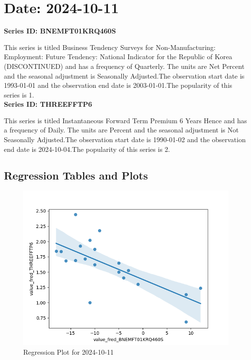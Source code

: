\section{Date: 2024-10-11}
\noindent \textbf{Series ID: BNEMFT01KRQ460S} 

\noindent This series is titled Business Tendency Surveys for Non-Manufacturing: Employment: Future Tendency: National Indicator for the Republic of Korea (DISCONTINUED) and has a frequency of Quarterly. The units are Net Percent and the seasonal adjustment is Seasonally Adjusted.The observation start date is 1993-01-01 and the observation end date is 2003-01-01.The popularity of this series is 1. \\ 

\noindent \textbf{Series ID: THREEFFTP6} 

\noindent This series is titled Instantaneous Forward Term Premium 6 Years Hence and has a frequency of Daily. The units are Percent and the seasonal adjustment is Not Seasonally Adjusted.The observation start date is 1990-01-02 and the observation end date is 2024-10-04.The popularity of this series is 2. \\ 

\subsection{Regression Tables and Plots}


\begin{figure}
\centering
\includegraphics[scale = 0.9]{plots/plot_2024-10-11.png}
\caption{Regression Plot for 2024-10-11}
\end{figure}
\newpage
